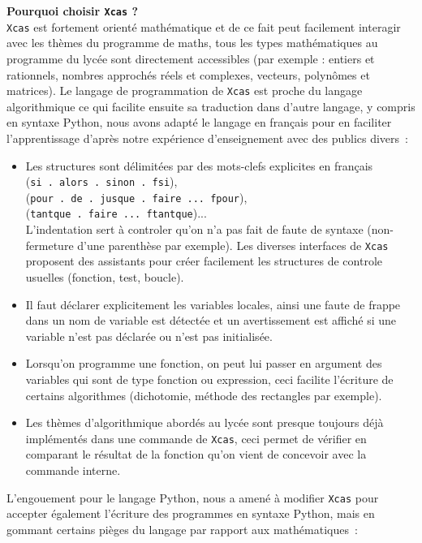\documentclass[12pt,a4paper]{book}
\begin{document}
\begin{giacjshere}
{\bf Pourquoi choisir {\tt Xcas} ?}\\
{\tt Xcas} est fortement orient\'e math\'ematique et de ce fait
peut facilement interagir avec les th\`emes du programme de maths, tous
les types math\'ematiques au programme du lyc\'ee sont directement accessibles 
(par exemple : entiers et rationnels, nombres approch\'es r\'eels
et complexes, vecteurs, polyn\^omes et matrices). 
Le langage de programmation de {\tt Xcas} est proche du langage algorithmique
ce qui facilite ensuite sa traduction dans d'autre langage, y compris 
en syntaxe Python,
nous avons adapt\'e le langage en fran\c{c}ais pour en faciliter l'apprentissage
d'apr\`es notre exp\'erience d'enseignement avec des publics divers~:
\begin{itemize}
\item Les structures sont d\'elimit\'ees par des mots-clefs explicites 
en fran\c{c}ais \\
(\verb|si . alors . sinon . fsi|),\\
(\verb|pour . de . jusque . faire ... fpour|),\\
(\verb|tantque . faire ... ftantque|)...\\
L'indentation sert \`a controler qu'on n'a pas fait
de faute de syntaxe (non-fermeture d'une parenth\`ese par exemple).
Les diverses interfaces de {\tt Xcas} proposent des assistants
pour cr\'eer facilement les structures de controle usuelles 
(fonction, test, boucle).
\item Il faut d\'eclarer explicitement les variables locales, ainsi une
faute de frappe dans un nom de variable est d\'etect\'ee et un
avertissement est affich\'e si une variable n'est pas d\'eclar\'ee ou n'est pas
initialis\'ee.
\item Lorsqu'on programme une fonction, on peut lui passer en argument des 
variables qui sont de type fonction ou expression, ceci facilite l'\'ecriture 
de certains algorithmes (dichotomie, m\'ethode des rectangles par exemple).
\item Les th\`emes d'algorithmique abord\'es au lyc\'ee sont
presque toujours d\'ej\`a impl\'ement\'es dans une commande de {\tt Xcas}, 
ceci
permet de v\'erifier en comparant le r\'esultat de la fonction qu'on
vient de concevoir avec la commande interne.
\end{itemize}
L'engouement pour le langage Python, nous a amené \`a modifier 
{\tt Xcas} pour accepter \'egalement l'\'ecriture des programmes 
en syntaxe Python, mais en gommant certains pi\`eges du langage 
par rapport aux math\'ematiques~:
\begin{itemize}

\end{itemize}
\end{giacjshere}
\end{document}
